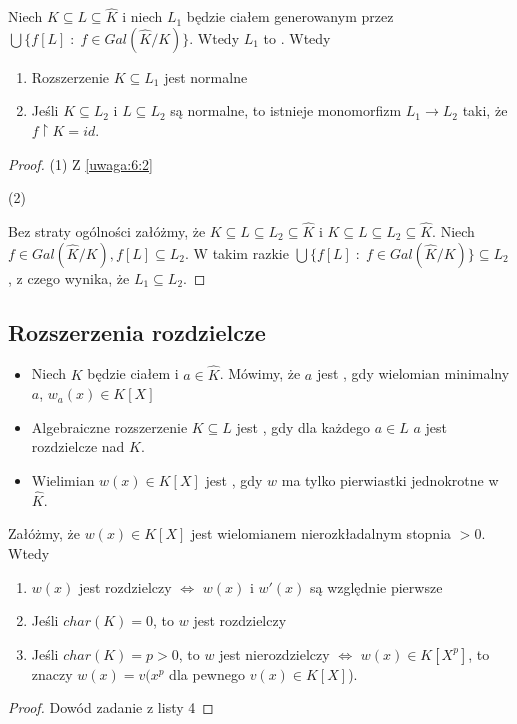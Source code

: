 \begin{remark}
    Niech $K\subseteq L\subseteq \hat{K}$ i niech $L_1$ będzie ciałem generowanym przez $\bigcup\{f[L]\;:\;f\in Gal(\hat{K}/K)\}$. Wtedy $L_1$ to . Wtedy
    \begin{enumerate}
        \item Rozszerzenie $K\subseteq L_1$ jest normalne
        \item Jeśli $K\subseteq L_2$ i $L\subseteq L_2$ są normalne, to istnieje monomorfizm $L_1\to L_2$ taki, że $f\restriction K=id$.
    \end{enumerate}
\end{remark}
\begin{proof}
    (1) Z \ref{uwaga:6:2}

    (2)

    Bez straty ogólności załóżmy, że $K\subseteq L\subseteq L_2\subseteq\hat{K}$ i $K\subseteq L\subseteq L_2\subseteq\hat{K}$. Niech $f\in Gal(\hat{K}/K),f[L]\subseteq L_2$. W takim razkie $\bigcup\{f[L]\;:\;f\in Gal(\hat{K}/K)\}\subseteq L_2$, z czego wynika, że $L_1\subseteq L_2$.
\end{proof}

\subsection{Rozszerzenia rozdzielcze}

\begin{bbox}
\begin{itemize}[leftmargin=*]
    \item Niech $K$ będzie ciałem i $a\in \hat{K}$. Mówimy, że $a$ jest , gdy wielomian minimalny $a$, $w_a(x)\in K[X]$
    \item Algebraiczne rozszerzenie $K\subseteq L$ jest , gdy dla każdego $a\in L$ $a$ jest rozdzielcze nad $K$.
    \item Wielimian $w(x)\in K[X]$ jest , gdy $w$ ma tylko pierwiastki jednokrotne w $\hat{K}$.
\end{itemize}
\end{bbox}

\begin{remark}
Załóżmy, że $w(x)\in K[X]$ jest wielomianem nierozkładalnym stopnia $>0$. Wtedy
\begin{enumerate}
    \item $w(x)$ jest rozdzielczy $\iff$ $w(x)$ i $w'(x)$ są względnie pierwsze
    \item Jeśli $char(K)=0$, to $w$ jest rozdzielczy
    \item Jeśli $char(K)=p>0$, to $w$ jest nierozdzielczy $\iff$ $w(x)\in K[X^p]$, to znaczy $w(x)=v(x^p$ dla pewnego $v(x)\in K[X]$).
\end{enumerate}
\end{remark}
\begin{proof}
    Dowód zadanie  z listy 4
\end{proof}


